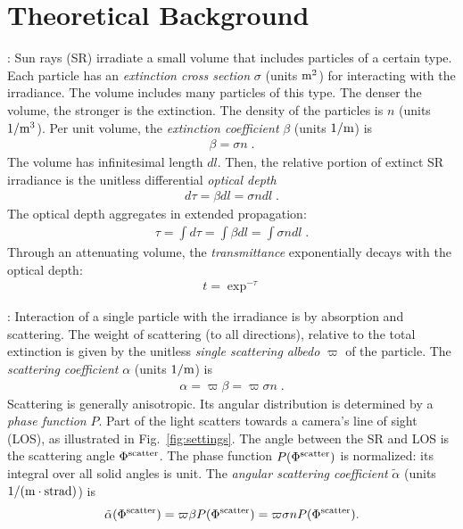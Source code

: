 \documentclass[10pt,twocolumn,letterpaper]{article}
\begin{document}
\section{Theoretical Background}
\label{sec:back}
 \vspace{-0.2cm}

:
Sun rays (SR) irradiate a small volume that includes particles of a certain type.
Each particle has an {\em extinction cross section} $\sigma$ (units ${\rm m}^2$)
for interacting with the irradiance. The volume includes
many particles of this type. The denser the volume, the stronger is the extinction.
The density of the particles is $n$ (units $1/{\rm m}^3$). Per unit volume, the {\em extinction coefficient} $\beta$ (units $1/{\rm m}$) is
\begin{align}
  \beta= \sigma n
  \;.
  \label{eq:extinctc}
\end{align}
The volume has infinitesimal length $dl$. Then, the relative portion of extinct SR irradiance is the unitless differential {\em optical depth}
\begin{align}
  d\tau= \beta dl=\sigma n dl
  \;.
  \label{eq:extinct}
\end{align}
The optical depth aggregates in extended propagation: 
\begin{align}
  \tau= \int d\tau=\int \beta dl=\int \sigma n dl
  \;.
  \label{eq:tau}
\end{align}
Through an attenuating volume, the {\em transmittance} exponentially decays with the optical depth:
\begin{align}
  t=\exp^{-\tau}
  \label{eq:beer-lambert}
\end{align}


: Interaction of a single particle with the irradiance
is by absorption and scattering. The weight of scattering (to all directions), relative to the total extinction is given by the unitless {\em single scattering albedo} $\varpi$ of the particle. The {\em scattering coefficient} $\alpha$ (units $1/{\rm m}$) is 
\begin{align}
  \alpha= \varpi\beta=\varpi \sigma n
  \;.
  \label{eq:alph}
\end{align}
Scattering is generally anisotropic. Its angular distribution is determined by
a {\em phase function} $P$. Part of the light scatters towards a camera's line of sight (LOS), as illustrated in
Fig.~\ref{fig:settings}. The angle between the SR and LOS is the scattering angle $\Phi^{\rm scatter}$. The phase function
$P(\Phi^{\rm scatter})$ is normalized: its integral over all solid angles is unit. The {\em angular scattering coefficient}
$\tilde\alpha$ (units $1/({\rm m}\cdot{{\rm strad}})$) is
\begin{align}
  \tilde\alpha(\Phi^{\rm scatter})
  = \varpi\beta P(\Phi^{\rm scatter})
  = \varpi \sigma n P(\Phi^{\rm scatter}).
  \label{eq:alphabasic}
\end{align}
\end{document}
